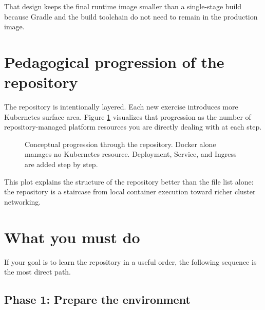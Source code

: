 \documentclass[11pt,a4paper]{article}
\begin{document}
That design keeps the final runtime image smaller than a single-stage build because Gradle and the build toolchain do not need to remain in the production image.

\section{Pedagogical progression of the repository}

The repository is intentionally layered. Each new exercise introduces more Kubernetes surface area. Figure \ref{fig:plot} visualizes that progression as the number of repository-managed platform resources you are directly dealing with at each step.

\begin{figure}[ht]
\centering
{}
\caption{Conceptual progression through the repository. Docker alone manages no Kubernetes resource. Deployment, Service, and Ingress are added step by step.}
\label{fig:plot}
\end{figure}

This plot explains the structure of the repository better than the file list alone: the repository is a staircase from local container execution toward richer cluster networking.

\section{What you must do}

If your goal is to learn the repository in a useful order, the following sequence is the most direct path.

\subsection{Phase 1: Prepare the environment}
\end{document}
